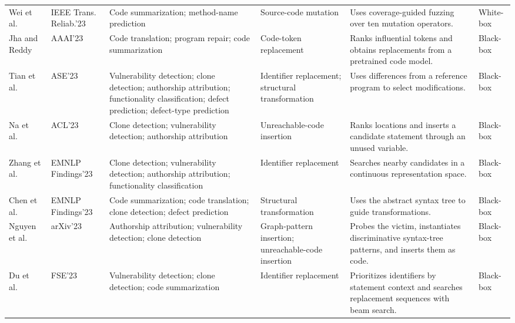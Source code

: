 \documentclass[acmsmall,screen,review,nonacm]{acmart}
\begin{document}
{\begin{longtable}{@{}L{2.1cm}L{1.5cm}L{2.30cm}L{2.50cm}L{3.50cm}L{1.35cm}@{}}
Wei et al.~\cite{wei2022cocofuzzing} &
IEEE Trans. Reliab.'23 &
Code summarization; method-name prediction &
Source-code mutation &
Uses coverage-guided fuzzing over ten mutation operators. &
White-box \\

Jha and Reddy~\cite{jha2023codeattack} &
AAAI'23 &
Code translation; program repair; code summarization &
Code-token replacement &
Ranks influential tokens and obtains replacements from a pretrained code model. &
Black-box \\

Tian et al.~\cite{tian2023coda} &
ASE'23 &
Vulnerability detection; clone detection; authorship attribution; functionality classification; defect prediction; defect-type prediction &
Identifier replacement; structural transformation &
Uses differences from a reference program to select modifications. &
Black-box \\

Na et al.~\cite{na2023dip} &
ACL'23 &
Clone detection; vulnerability detection; authorship attribution &
Unreachable-code insertion &
Ranks locations and inserts a candidate statement through an unused variable. &
Black-box \\

Zhang et al.~\cite{zhang2023rnns} &
EMNLP Findings'23 &
Clone detection; vulnerability detection; authorship attribution; functionality classification &
Identifier replacement &
Searches nearby candidates in a continuous representation space. &
Black-box \\

Chen et al.~\cite{chen2023structure} &
EMNLP Findings'23 &
Code summarization; code translation; clone detection; defect prediction &
Structural transformation &
Uses the abstract syntax tree to guide transformations. &
Black-box \\

Nguyen et al.~\cite{nguyen2023graphcodeattack} &
arXiv'23 &
Authorship attribution; vulnerability detection; clone detection &
Graph-pattern insertion; unreachable-code insertion &
Probes the victim, instantiates discriminative syntax-tree patterns, and inserts them as code. &
Black-box \\

Du et al.~\cite{gu2023beamattack} &
FSE'23 &
Vulnerability detection; clone detection; code summarization &
Identifier replacement &
Prioritizes identifiers by statement context and searches replacement sequences with beam search. &
Black-box \\


\end{longtable}}
\end{document}
